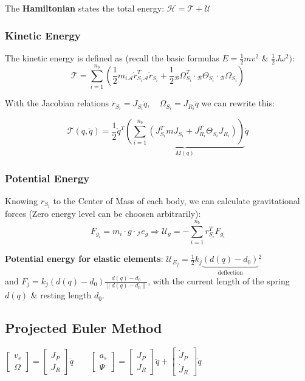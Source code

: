 \documentclass[fontsize=6pt,DIV=calc,a4paper,ngerman]{scrartcl}
\begin{document}
\begin{multicols*}{4}
	The \textbf{Hamiltonian} states the total energy: $\mathcal{H}= \mathcal{T}+\mathcal{U}$

	\subsubsection{Kinetic Energy}

	The kinetic energy is defined as (recall the basic formulas $E = \frac{1}{2}mv^2$ \& $\frac{1}{2}J\omega^2)$:
	$$\mathcal{T} = \sum_{i=1}^{n_b}\left( \frac{1}{2} m_i{}_\mathcal{A}\dot{r}^{T}_{S_i}{}_\mathcal{A}\dot{r}_{S_i}+\frac{1}{2}{}_\mathcal{B}\Omega_{S_i}^T \cdot {}_\mathcal{B}\Theta_{S_i}\cdot {}_\mathcal{B}\Omega_{S_i}\right)$$

	With the Jacobian relations $\dot{r}_{S_i} = J_{S_i}\dot{q}, \quad \Omega_{S_i} = J_{R_i}\dot{q} $ we can rewrite this:

	$$\mathcal{T}(q,\dot{q}) = \frac{1}{2} \dot{q}^T \underbrace{ \left( \sum_{i=1}^{n_b} (J_{S_i}^T mJ_{S_i} + J_{R_i}^T \Theta_{S_i}J_{R_i})\right)}_{M(q)}\dot{q}$$

	\subsubsection{Potential Energy}
	Knowing $r_{S_i}$ to the Center of Mass of each body, we can calculate gravitational forces (Zero energy level can be choosen arbitrarily):
	$$F_{g_i}= m_i\cdot g\cdot {}_\mathcal{I}e_g \Rightarrow \mathcal{U}_g= -\sum_{i=1}^{n_b} r_{S_i}^TF_{g_i}$$

	\textbf{Potential energy for elastic elements}:
	$\mathcal{U}_{E_j} = \frac{1}{2} k_j\underbrace{(d(q)-d_0)}_{\text{deflection}}{}^2$\\
	and $F_j = k_j(d(q) - d_0) \frac{d(q)- d_0}{\| d(q) - d_0\|} $, with the current length of the spring $d(q)$ \& resting length $d_0$.


	\subsection{Projected Euler Method}
	$\left[\begin{smallmatrix}
				v_s \\ \Omega
			\end{smallmatrix}\right] =
		\left[\begin{smallmatrix}
				J_P \\ J_R
			\end{smallmatrix}\right] \dot{q} \qquad
		\left[\begin{smallmatrix}
				a_s \\ \Psi
			\end{smallmatrix}\right] =
		\left[\begin{smallmatrix}
				J_P \\ J_R
			\end{smallmatrix}\right] \ddot{q} + \left[\begin{smallmatrix}
				\dot{J}_P \\ \dot{J}_R
			\end{smallmatrix}\right] \dot{q}$


\end{multicols*}
\end{document}
